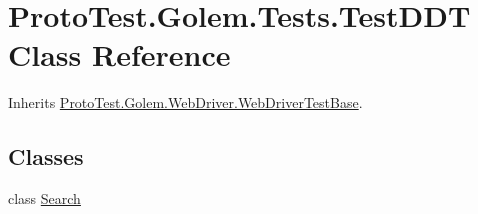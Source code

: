 \hypertarget{class_proto_test_1_1_golem_1_1_tests_1_1_test_d_d_t}{\section{Proto\-Test.\-Golem.\-Tests.\-Test\-D\-D\-T Class Reference}
\label{class_proto_test_1_1_golem_1_1_tests_1_1_test_d_d_t}
}


Inherits \hyperlink{class_proto_test_1_1_golem_1_1_web_driver_1_1_web_driver_test_base}{Proto\-Test.\-Golem.\-Web\-Driver.\-Web\-Driver\-Test\-Base}.

\subsection*{Classes}
\begin{DoxyCompactItemize}
\item 
class \hyperlink{class_proto_test_1_1_golem_1_1_tests_1_1_test_d_d_t_1_1_search}{Search}
\end{DoxyCompactItemize}
